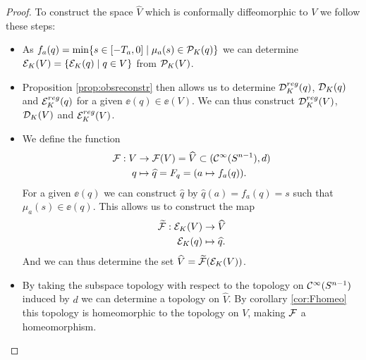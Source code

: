 \begin{proof}
    
    To construct the space $\widehat{V}$ which is conformally diffeomorphic to $V$ we follow these steps:
    \begin{itemize}
        \item As $f_a(q) = \min \{s\in [-T_a,0] \mid \mu_a(s) \in {\mathcal{P}}_K(q)\}$ we can determine ${\mathcal{E}}_K(V) = \{{{\mathcal{E}}_K}(q) \mid q\in V\}$ from ${\mathcal{P}}_K(V)$.
        \item Proposition \ref{prop:obsreconstr} then allows us to determine ${\mathcal{D}}^{reg}_K(q)$, ${\mathcal{D}}_K(q)$ and ${{\mathcal{E}}^{reg}_K}(q)$ for a given $\ee(q)\in \ee(V)$. We can thus construct ${\mathcal{D}}^{reg}_K(V)$, ${\mathcal{D}}_K(V)$ and ${{\mathcal{E}}^{reg}_K}(V)$.
        \item We define the function 
        \begin{align*}
            \mathcal{F}:V&\to \mathcal{F}(V) = \widehat{V} \subset ({\mathcal{C}}^\infty({S^{n-1}}),d)\\
            q &\mapsto \widehat{q} = F_q = (a\mapsto f_a(q)).
        \end{align*}
        For a given $\ee(q)$ we can construct $\widehat{q}$ by $\widehat{q}(a) = f_a(q) = s$ such that $\mu_a(s) \in \ee(q)$.
        This allows us to construct the map
        \begin{align*}
            \widetilde{\mathcal{F}}:{{\mathcal{E}}_K}(V)&\to \widehat{V}\\
            {{\mathcal{E}}_K}(q) &\mapsto \widehat{q}.
        \end{align*}
        And we can thus determine the set $\widehat{V} = \widetilde{\mathcal{F}}({{\mathcal{E}}_K}(V))$.

        \item By taking the subspace topology with respect to the topology on ${\mathcal{C}}^\infty({S^{n-1}})$ induced by $d$ we can determine a topology on $\widehat{V}$. By corollary \ref{cor:Fhomeo} this topology is homeomorphic to the topology on $V$, making $\mathcal{F}$ a homeomorphism.
        
        

\end{itemize}
\end{proof}
